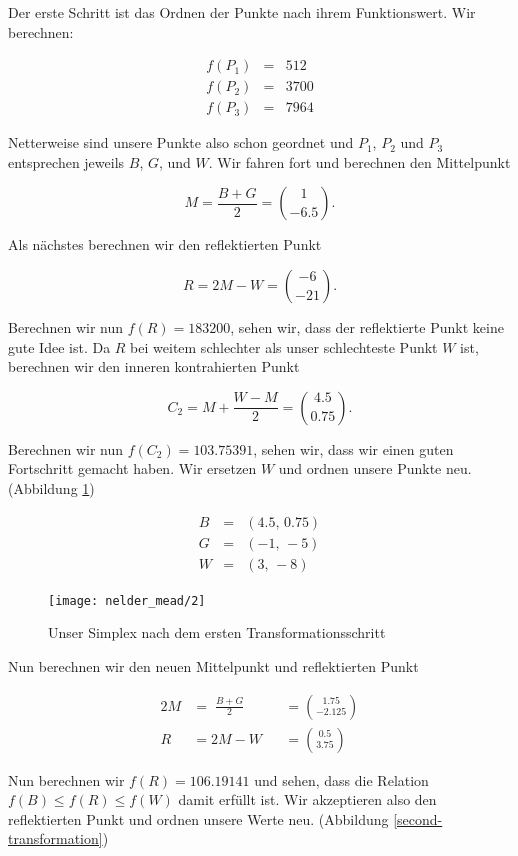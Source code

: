 \documentclass[naustrian]{article}
\begin{document}
{Der erste Schritt ist das Ordnen der Punkte nach ihrem Funktionswert. Wir berechnen:

\begin{eqnarray*}
    f(P_{1}) & = & 512\\
    f(P_{2}) & = & 3700\\
    f(P_{3}) & = & 7964
\end{eqnarray*}

Netterweise sind unsere Punkte also schon geordnet und $P_{1}$, $P_{2}$ und
$P_{3}$ entsprechen jeweils $B$, $G$, und $W$. Wir fahren fort und berechnen
den Mittelpunkt

\[
    M = \frac{B + G}{2} = \binom{1}{-6.5}.
\]

Als nächstes berechnen wir den reflektierten Punkt

\[
    R = 2M - W = \binom{-6}{-21}.
\]

Berechnen wir nun $f(R) = 183200$, sehen wir, dass der reflektierte Punkt keine
gute Idee ist. Da $R$ bei weitem schlechter als unser schlechteste Punkt $W$
ist, berechnen wir den inneren kontrahierten Punkt

\[
    C_{2} = M + \frac{W - M}{2} = \binom{4.5}{0.75}.
\]

Berechnen wir nun $f(C_{2}) = 103.75391$, sehen wir, dass
wir einen guten Fortschritt gemacht haben. Wir ersetzen
$W$ und ordnen unsere Punkte neu. (Abbildung \ref{first-transformation})

\begin{eqnarray*}
    B & = & (4.5, \, 0.75)\\
    G & = & (-1,\,-5)\\
    W & = & (3,\,-8)
\end{eqnarray*}

\begin{figure}[h]
    \centering
    \texttt{[image: nelder\_mead/2]}
    \caption{Unser Simplex nach dem ersten Transformationsschritt}
    \label{first-transformation}
\end{figure}

Nun berechnen wir den neuen Mittelpunkt und reflektierten Punkt

\begin{alignat*}{2}
    M &= \;\frac{B + G}{2} &&= \binom{1.75}{-2.125}\\
    R &= 2M - W &&= \binom{0.5}{3.75}
\end{alignat*}

Nun berechnen wir $f(R) = 106.19141$ und sehen, dass die Relation $f(B) \leq
f(R) \leq f(W)$ damit erfüllt ist. Wir akzeptieren also den reflektierten Punkt
und ordnen unsere Werte neu. (Abbildung \ref{second-transformation})

}
\end{document}
